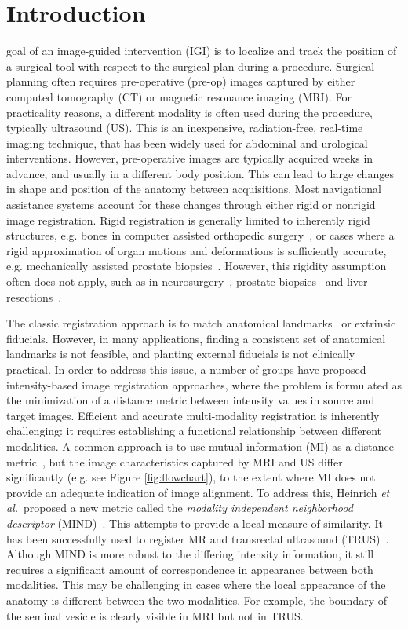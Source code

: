 \documentclass[journal]{IEEEtran}
\begin{document}
\section{Introduction}
 goal of an image-guided intervention (IGI) is to localize and track the position of a surgical tool with respect to the surgical plan during a procedure. Surgical planning often requires pre-operative (pre-op) images captured by either computed tomography (CT) or magnetic resonance imaging (MRI). For practicality reasons, a different modality is often used during the procedure, typically ultrasound (US).  This is an inexpensive, radiation-free, real-time imaging technique, that has been widely used for abdominal and urological interventions. However, pre-operative images are typically acquired weeks in advance, and usually in a different body position. This can lead to large changes in shape and position of the anatomy between acquisitions. Most navigational assistance systems account for these changes through either rigid or nonrigid image registration. Rigid registration is generally limited to inherently rigid structures, e.g. bones in computer assisted orthopedic surgery~\cite{Brounstein11a,Rasoulian12a}, or cases where a rigid approximation of organ motions and deformations is sufficiently accurate, e.g. mechanically assisted prostate biopsies~\cite{Silva13a}. However, this rigidity assumption often does not apply, such as in neurosurgery~\cite{Ferrant00a}, prostate biopsies~\cite{Baumann12a} and liver resections~\cite{Rucker14a}. 

The classic registration approach is to match anatomical landmarks~\cite{Arun87a} or extrinsic fiducials. However, in many applications, finding a consistent set of anatomical landmarks is not feasible, and planting external fiducials is not clinically practical.  In order to address this issue, a number of groups have proposed intensity-based image registration approaches, where the problem is formulated as the minimization of a distance metric between intensity values in source and target images.  Efficient and accurate multi-modality registration is inherently challenging: it requires establishing a functional relationship between different modalities. A common approach is to use mutual information (MI) as a distance metric~\cite{Wells96a}, but the image characteristics captured by MRI and US differ significantly (e.g. see Figure \ref{fig:flowchart}), to the extent where MI does not provide an adequate indication of image alignment. To address this, Heinrich \textit{et al.}~proposed a new metric called the \textit{modality independent neighborhood descriptor} (MIND)~\cite{Heinrich12a}.  This attempts to provide a local measure of similarity. It has been successfully used to register MR and transrectal ultrasound (TRUS)~\cite{Sun13a}. Although MIND is more robust to the differing intensity information, it still requires a significant amount of correspondence in appearance between both modalities. This may be challenging in cases where the local appearance of the anatomy is different between the two modalities. For example, the boundary of the seminal vesicle is clearly visible in MRI but not in TRUS.
\end{document}
